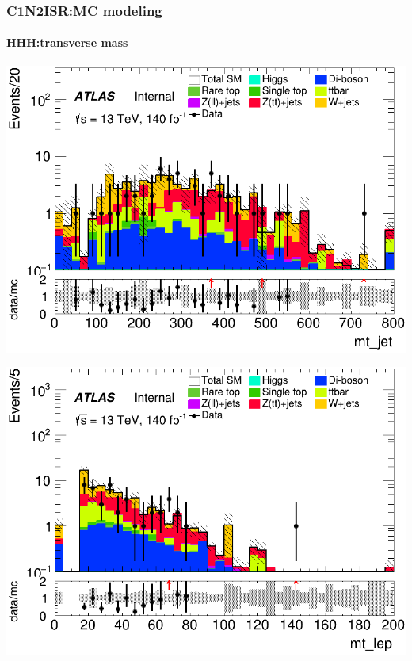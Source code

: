 \documentclass[usenames,dvipsnames]{beamer}
\begin{document}
\begin{frame}
\frametitle{C1N2ISR:MC modeling}
\framesubtitle{HHH:\quad transverse mass}
    \begin{minipage}{0.32\textwidth}
        \centering
        \includegraphics[width=\textwidth]{graphics/HHH_met/HHH_met_mt_jet.png}
    \end{minipage}
    \hfill
    \begin{minipage}{0.32\textwidth}
        \centering
        \includegraphics[width=\textwidth]{graphics/HHH_met/HHH_met_mt_lep.png}
    \end{minipage}
    \hfill
    \begin{minipage}{0.32\textwidth}
        \centering

\end{minipage}
\end{frame}
\end{document}
